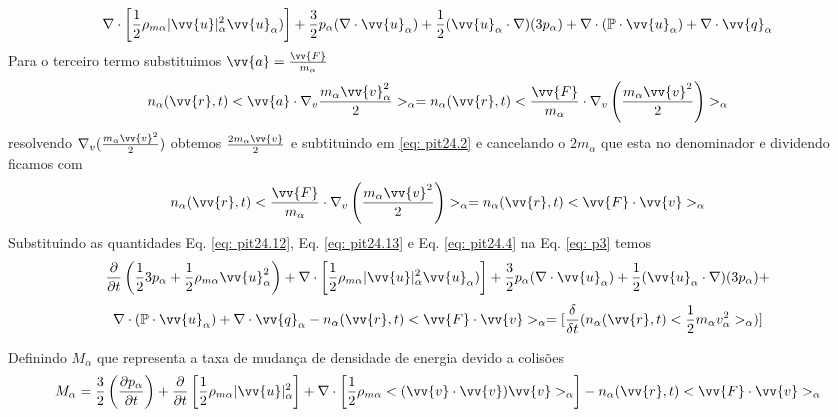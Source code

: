\documentclass[12pt,oneside,a4paper]{abntex2}
\begin{document}
\begin{equation*}
\nabla \cdot \left[ \frac{1}{2}\rho_{m\alpha}|\vv{u}|^2_\alpha \vv{u}_\alpha) \right]+ \frac{3}{2}p_\alpha (\nabla \cdot \vv{u}_\alpha) +  \frac{1}{2}(\vv{u}_\alpha \cdot \nabla)(3p_\alpha)+\nabla \cdot (\mathbb{P} \cdot \vv{u}_\alpha) + \nabla \cdot \vv{q}_\alpha
\end{equation*}
Para o terceiro termo substituimos $\vv{a} =  \frac{\vv{F}}{m_\alpha}$ 
\begin{equation}
\label{eq: pit24.21}
n_\alpha(\vv{r},t) <\vv{a} \cdot \nabla_v \frac{m_\alpha \vv{v}^2_\alpha}{2}>_\alpha = n_\alpha(\vv{r},t)<\frac{\vv{F}}{m_\alpha} \cdot \nabla_v \left( \frac{m_\alpha \vv{v}^2}{2}\right)>_\alpha 
\end{equation}
resolvendo $\nabla_v ( \frac{m_\alpha \vv{v}^2}{2})$ obtemos $\frac{2m_\alpha \vv{v}}{2}$ e subtituindo em \ref{eq: pit24.2} e cancelando o $2m_\alpha$ que esta no denominador e dividendo ficamos com
\begin{equation}
\label{eq: pit24.4}
n_\alpha(\vv{r},t)<\frac{\vv{F}}{m_\alpha} \cdot \nabla_v \left( \frac{m_\alpha \vv{v}^2}{2}\right)>_\alpha = n_\alpha(\vv{r},t) <\vv{F} \cdot \vv{v}>_\alpha
\end{equation}
Substituindo as quantidades Eq. \ref{eq: pit24.12}, Eq. \ref{eq: pit24.13} e Eq. \ref{eq: pit24.4} na Eq. \ref{eq: p3} temos
\begin{equation}
\label{eq: p4}
\frac{\partial }{\partial t}  \left( \frac{1}{2} 3p_\alpha+\frac{1}{2} \rho_{m\alpha}\vv{u}^2_\alpha \right) +\nabla \cdot \left[ \frac{1}{2}\rho_{m\alpha}|\vv{u}|^2_\alpha \vv{u}_\alpha) \right]+ \frac{3}{2}p_\alpha (\nabla \cdot \vv{u}_\alpha) +  \frac{1}{2}(\vv{u}_\alpha \cdot \nabla)(3p_\alpha)+ 
\end{equation}
\begin{equation*}
\nabla \cdot (\mathbb{P} \cdot \vv{u}_\alpha) + \nabla \cdot \vv{q}_\alpha-n_\alpha(\vv{r},t) <\vv{F} \cdot \vv{v}>_\alpha =[\frac{\delta}{\delta t}(n_\alpha(\vv{r},t)<\frac{1}{2}m_\alpha v_{\alpha}^2>_\alpha)]
\end{equation*}

Definindo $M_\alpha$ que representa a taxa de mudança de densidade de energia devido a colisões
\begin{equation}
M_\alpha = \frac{3}{2} \left(  \frac{\partial p_\alpha}{\partial t}  \right) + \frac{\partial}{\partial t} \left[ \frac{1}{2}\rho_{m\alpha}|\vv{u}|^2_\alpha \right]+ \nabla \cdot \left[\frac{1}{2}\rho_{m\alpha}<(\vv{v} \cdot \vv{v})\vv{v}>_\alpha \right] -  n_\alpha(\vv{r},t)<\vv{F} \cdot \vv{v}>_\alpha
\end{equation}
\end{document}
